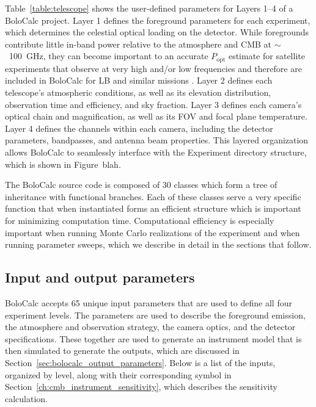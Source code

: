 Table~\ref{table:telescope} shows the user-defined parameters for Layers 1--4 of a BoloCalc project. Layer 1 defines the foreground parameters for each experiment, which determines the celestial optical loading on the detector. While foregrounds contribute little in-band power relative to the atmosphere and CMB at $\sim$~100~GHz, they can become important to an accurate $P_{\mathrm{opt}}$ estimate for satellite experiments that observe at very high and/or low frequencies and therefore are included in BoloCalc for LB and similar missions \cite{litebird_spie_2018}. Layer 2 defines each telescope's atmospheric conditions, as well as its elevation distribution, observation time and efficiency, and sky fraction. Layer 3 defines each camera's optical chain and magnification, as well as its FOV and focal plane temperature. Layer 4 defines the channels within each camera, including the detector parameters, bandpasses, and antenna beam properties. This layered organization allows BoloCalc to seamlessly interface with the Experiment directory structure, which is shown in Figure~blah. 

The BoloCalc source code is composed of 30 classes which form a tree of inheritance with functional branches. Each of these classes serve a very specific function that when instantiated forms an efficient structure which is important for minimizing computation time. Computational efficiency is especially important when running Monte Carlo realizations of the experiment and when running parameter sweeps, which we describe in detail in the sections that follow.


\subsection{Input and output parameters}
\label{sec:bolocalc_input_parameters}

BoloCalc accepts 65 unique input parameters that are used to define all four experiment levels. The parameters are used to describe the foreground emission, the atmosphere and observation strategy, the camera optics, and the detector specifications. These together are used to generate an instrument model that is then simulated to generate the outputs, which are discussed in Section~\ref{sec:bolocalc_output_parameters}. Below is a list of the inputs, organized by level, along with their corresponding symbol in Section~\ref{ch:cmb_instrument_sensitivity}, which describes the sensitivity calculation.  

